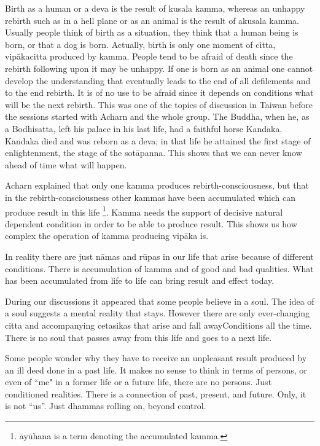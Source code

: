 \documentclass{book}
\begin{document}
Birth as a human or a deva is the result of
kusala kamma, whereas an unhappy rebirth such as in a hell plane or as
an animal is the result of akusala kamma. Usually people think of birth
as a situation, they think that a human being is born, or that a dog is
born. Actually, birth is only one moment of citta, vipākacitta produced
by kamma. People tend to be afraid of death since the rebirth following
upon it may be unhappy. If one is born as an animal one cannot develop
the understanding that eventually leads to the end of all defilements
and to the end rebirth. It is of no use to be afraid since it depends on
conditions what will be the next rebirth. This was one of the topics of
discussion in Taiwan before the sessions started with Acharn and the
whole group. The Buddha, when he, as a Bodhisatta, left his palace in
his last life, had a faithful horse Kandaka. Kandaka died and was reborn
as a deva; in that life he attained the first stage of enlightenment,
the stage of the sotāpanna. This shows that we can never know ahead of
time what will happen. 

Acharn explained that
only one kamma produces
rebirth-consciousness, but that in the rebirth-consciousness
other kammas have been
accumulated which can produce result in
this life
\footnote{āyūhana is a term denoting the accumulated kamma.}.
Kamma needs the support of decisive natural dependent
condition in order to be able to produce result. This shows us how
complex the operation of kamma producing vipāka is. 

In reality there are
just nāmas and
rūpas in our life that arise
because of different conditions. There is
accumulation of kamma and of
good and bad qualities. What has been accumulated from life to life can
bring result and effect today. 

During our discussions
it appeared that some people believe in a soul. The idea of a soul
suggests a mental reality that stays. However there are only
ever-changing citta and accompanying cetasikas that arise and fall awayConditions
all the time. There is no soul that passes away from this life and goes
to a next life.

Some people wonder why they have to receive
an unpleasant result produced by an ill deed done in a past life.
It makes no sense to think in terms of
persons, or even of ``me" in a former
life or a future life, there are no persons. Just conditioned
realities. There is
a connection of past,
present, and future. Only,
it is not ``us''. Just
dhammas rolling on, beyond
control.
\end{document}

